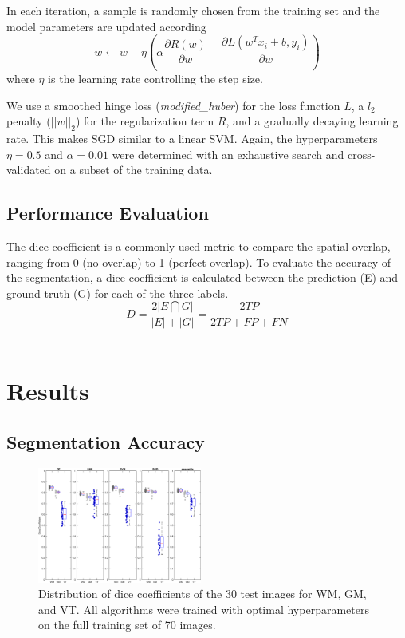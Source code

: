 \documentclass[journal]{IEEEtran}
\begin{document}
In each iteration, a sample is randomly chosen from the training set and the model parameters are updated according
\begin{equation}
w \leftarrow w - \eta \left(\alpha \frac{\partial R(w)}{\partial w} + \frac{\partial L (w^Tx_i + b, y_i)}{\partial w} \right)
\end{equation}
where $\eta$ is the learning rate controlling the step size.

We use a smoothed hinge loss (\textit{modified\_huber}) for the loss function $L$, a $l_2$ penalty ($||w||_2$) for the regularization term $R$, and a gradually decaying learning rate. This makes SGD similar to a linear SVM. Again, the hyperparameters $\eta = 0.5$ and $\alpha = 0.01$ were determined with an exhaustive search and cross-validated on a subset of the training data.


\subsection{Performance Evaluation}\label{ch.eval}
The dice coefficient is a commonly used metric to compare the spatial overlap, ranging from 0 (no overlap) to 1 (perfect overlap). To evaluate the accuracy of the segmentation, a dice coefficient is calculated between the prediction (E) and ground-truth (G) for each of the three labels. 
\begin{equation}
D = \frac{2|E \bigcap G|}{|E| + |G|} = \frac{2 TP}{2 TP + FP + FN}
\end{equation}\\

\section{Results}
\subsection{Segmentation Accuracy}
\begin{figure}
	\centering
	\includegraphics[width=0.48\textwidth]{images/boxplot}
	\caption{Distribution of dice coefficients of the 30 test images for WM, GM, and VT. All algorithms were trained with optimal hyperparameters on the full training set of 70 images.}\label{f.boxplot}
\end{figure}
\end{document}
